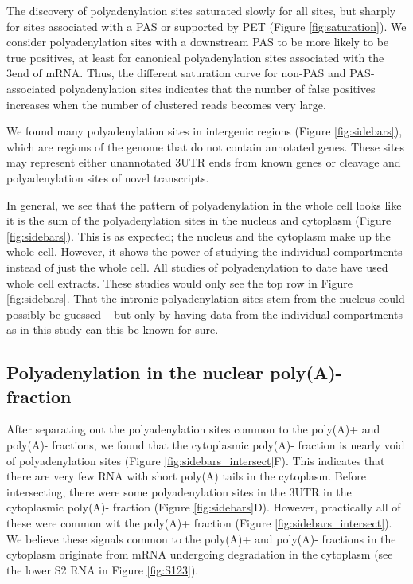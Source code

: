 The discovery of polyadenylation sites saturated slowly for all sites, but
sharply for sites associated with a PAS or supported by PET (Figure
\ref{fig:saturation}). We consider polyadenylation sites with a downstream PAS
to be more likely to be true positives, at least for canonical polyadenylation
sites associated with the 3\p end of mRNA. Thus, the different saturation curve
for non-PAS and PAS-associated polyadenylation sites indicates that the number
of false positives increases when the number of clustered reads becomes very
large. 

We found many polyadenylation sites in intergenic regions (Figure
\ref{fig:sidebars}), which are regions of the genome that do not contain
annotated genes. These sites may represent either unannotated 3\p UTR
ends from known genes or cleavage and polyadenylation sites of novel
transcripts.

In general, we see that the pattern of polyadenylation in the whole cell looks
like it is the sum of the polyadenylation sites in the nucleus and cytoplasm
(Figure \ref{fig:sidebars}). This is as expected; the nucleus and the cytoplasm
make up the whole cell. However, it shows the power of studying the individual
compartments instead of just the whole cell. All studies of polyadenylation to
date have used whole cell extracts. These studies would only see the top row in
Figure \ref{fig:sidebars}. That the intronic polyadenylation sites stem from
the nucleus could possibly be guessed -- but only by having data from the
individual compartments as in this study can this be known for sure.

\subsection{Polyadenylation in the nuclear poly(A)- fraction}
After separating out the polyadenylation sites common to the poly(A)+ and
poly(A)- fractions, we found that the cytoplasmic poly(A)- fraction is nearly
void of polyadenylation sites (Figure \ref{fig:sidebars_intersect}F). This
indicates that there are very few RNA with short poly(A) tails in the
cytoplasm. Before intersecting, there were some polyadenylation sites in the
3\p UTR in the cytoplasmic poly(A)- fraction (Figure \ref{fig:sidebars}D).
However, practically all of these were common wit the poly(A)+ fraction (Figure
\ref{fig:sidebars_intersect}). We believe these signals common to the poly(A)+
and poly(A)- fractions in the cytoplasm originate from mRNA undergoing
degradation in the cytoplasm (see the lower S2 RNA in Figure \ref{fig:S123}).

